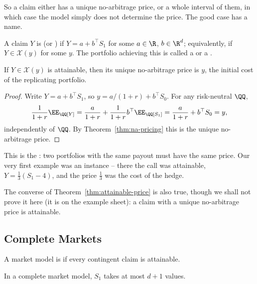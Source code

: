 So a claim either has a unique no-arbitrage price, or a whole interval of them, in which case the model simply does not determine the price. The good case has a name.

\begin{definition}
	A claim $Y$ is  (or ) if $Y = a + b^\top S_1$ for some $a \in \R$, $b \in \R^d$; equivalently, if $Y \in \mathcal{X}(y)$ for some $y$. The portfolio achieving this is called a  or a .
\end{definition}

\begin{theorem}\label{thm:attainable-price}
	If $Y \in \mathcal{X}(y)$ is attainable, then its unique no-arbitrage price is $y$, the initial cost of the replicating portfolio.
\end{theorem}

\begin{proof}
	Write $Y = a + b^\top S_1$, so $y = a/(1+r) + b^\top S_0$. For any risk-neutral $\QQ$,
	$$
	\frac{1}{1+r}\EE_\QQ[Y] = \frac{a}{1+r} + \frac{1}{1+r}b^\top \EE_\QQ[S_1] = \frac{a}{1+r} + b^\top S_0 = y,
	$$
	independently of $\QQ$. By Theorem~\ref{thm:na-pricing} this is the unique no-arbitrage price.
\end{proof}

This is the : two portfolios with the same payout must have the same price. Our very first example was an instance -- there the call was attainable, $Y = \tfrac13(S_1 - 4)$, and the price $\tfrac13$ was the cost of the hedge.

The converse of Theorem~\ref{thm:attainable-price} is also true, though we shall not prove it here (it is on the example sheet): a claim with a unique no-arbitrage price is attainable.

\subsection{Complete Markets}

\begin{definition}
	A market model is  if every contingent claim is attainable.
\end{definition}

\begin{proposition}
	In a complete market model, $S_1$ takes at most $d+1$ values.
\end{proposition}

